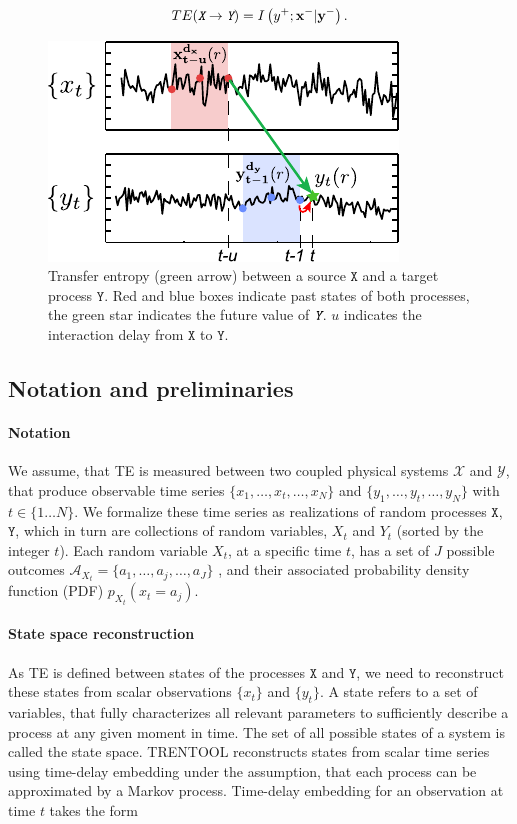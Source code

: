 \documentclass[a4paper,10pt]{article}
\begin{document}
\begin{equation}
 TE(\textit{\texttt{X}} \rightarrow \textit{\texttt{Y}}) = I\left(y^+;\mathbf{x}^-|\mathbf{y}^- \right).
\end{equation}

\begin{figure}[H]	
	\centering
 		\includegraphics[scale=1.00]{figures/TE_concept.pdf}
	\caption[TE concept]{Transfer entropy (green arrow) between a source $\texttt{X}$ and a target process $\texttt{Y}$. Red and blue boxes indicate past states of both processes, the green star indicates the future value of $\textit{\texttt{Y}}$. $u$ indicates the interaction delay from $\texttt{X}$ to $\texttt{Y}$.}
	\label{fig:TE_concept}
\end{figure} 


\subsection{Notation and preliminaries}

\paragraph*{Notation} We assume, that TE is measured between two coupled physical systems $\mathcal{X}$ and $\mathcal{Y}$, that produce observable time series $\{x_1, \ldots, x_t, \ldots, x_N\}$ and $\{y_1, \ldots, y_t, \ldots, y_N\}$ with $t \in \{1 \ldots N\}$. We formalize these time series as realizations of random processes $\texttt{X}$, $\texttt{Y}$, which in turn are collections of random variables, $X_t$ and $Y_t$ (sorted by the integer $t$). Each random variable $X_t$, at a specific time $t$, has a set of $J$ possible outcomes $\mathcal{A}_{X_t} = \{a_1, \ldots, a_j, \ldots ,a_J \}$ , and their associated probability density function (PDF) $p_{X_t} (x_t = a_j)$.  

\paragraph*{State space reconstruction} As TE is defined between states of the processes $\texttt{X}$ and $\texttt{Y}$, we need to reconstruct these states from scalar observations $\{x_t\}$ and $\{y_t\}$. A state refers to a set of variables, that fully characterizes all relevant parameters to sufficiently describe a process at any given moment in time. The set of all possible states of a system is called the state space. TRENTOOL reconstructs states from scalar time series using time-delay embedding \cite{takens1981} under the assumption, that each process can be approximated by a Markov process. Time-delay embedding for an observation at time $t$ takes the form
\end{document}
